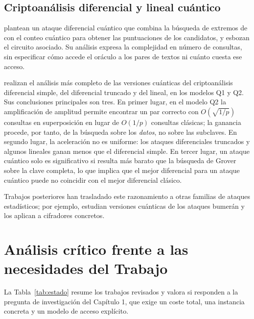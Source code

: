 \subsection{Criptoanálisis diferencial y lineal cuántico}

\citet{zhou2019} plantean un ataque diferencial cuántico que combina la búsqueda de extremos de \citet{durr1996} con el conteo cuántico para obtener las puntuaciones de los candidatos, y esbozan el circuito asociado. Su análisis expresa la complejidad en número de consultas, sin especificar cómo accede el oráculo a los pares de textos ni cuánto cuesta ese acceso.

\citet{kaplan2016diff} realizan el análisis más completo de las versiones cuánticas del criptoanálisis diferencial simple, del diferencial truncado y del lineal, en los modelos Q1 y Q2. Sus conclusiones principales son tres. En primer lugar, en el modelo Q2 la amplificación de amplitud permite encontrar un par correcto con \(O(\sqrt{1/p})\) consultas en superposición en lugar de \(O(1/p)\) consultas clásicas; la ganancia procede, por tanto, de la búsqueda sobre los \emph{datos}, no sobre las subclaves. En segundo lugar, la aceleración no es uniforme: los ataques diferenciales truncados y algunos lineales ganan menos que el diferencial simple. En tercer lugar, un ataque cuántico solo es significativo si resulta más barato que la búsqueda de Grover sobre la clave completa, lo que implica que el mejor diferencial para un ataque cuántico puede no coincidir con el mejor diferencial clásico.

Trabajos posteriores han trasladado este razonamiento a otras familias de ataques estadísticos; por ejemplo, \citet{frixons2022} estudian versiones cuánticas de los ataques bumerán y los aplican a cifradores concretos.

\section{Análisis crítico frente a las necesidades del Trabajo}
\label{sec:critica}

La Tabla~\ref{tab:estado} resume los trabajos revisados y valora si responden a la pregunta de investigación del Capítulo 1, que exige un coste total, una instancia concreta y un modelo de acceso explícito.

